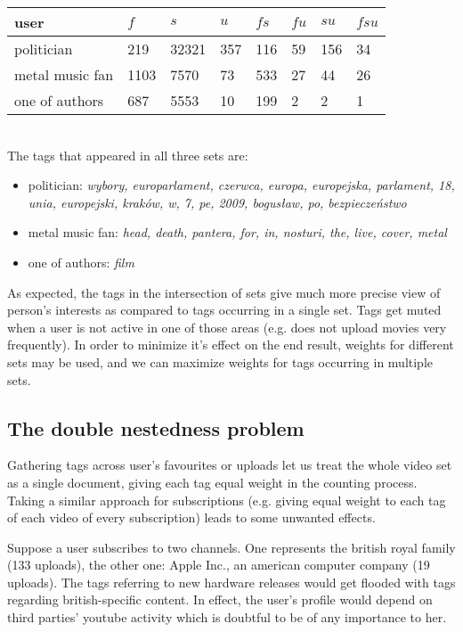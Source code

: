 \begin{tabular}{| l | l | l | l | l | l | l | l |}
user & $f$ & $s$ & $u$ & $fs$ & $fu$ & $su$ & $fsu$ \\ \hline
politician & 219 & 32321 & 357 & 116 & 59 & 156 & 34 \\
metal music fan & 1103 & 7570 & 73 & 533 & 27 & 44 & 26 \\
one of authors & 687 & 5553 & 10 & 199 & 2 & 2 & 1 \\
\end{tabular} \\

The tags that appeared in all three sets are:
\begin{itemize}
  \item{politician: \emph{wybory, europarlament, czerwca, europa, europejska,
  parlament, 18, unia, europejski, kraków, w, 7, pe, 2009, bogusław, po,
  bezpieczeństwo}}
  \item{metal music fan: \emph{head, death, pantera, for, in, nosturi, the, live, cover, metal}}
  \item{one of authors: \emph{film}}
\end{itemize}

As expected, the tags in the intersection of sets give much more precise view of person's
interests as compared to tags occurring in a single set. Tags get muted when a user is not active in one of
those areas (e.g. does not upload movies very frequently). In order to minimize it's effect on the
end result, weights for different sets may be used, and we can maximize weights for tags occurring
in multiple sets.

\subsection{The double nestedness problem}
Gathering tags across user's favourites or uploads let us treat the whole video
set as a single document, giving each tag equal weight in the counting process.
Taking a similar approach for subscriptions (e.g. giving equal weight to each
tag of each video of every subscription) leads to some unwanted effects.

Suppose a user subscribes to two channels. One represents the british royal
family (133 uploads), the other one: Apple Inc., an american computer company
(19 uploads). The tags referring to new hardware releases would get flooded with
tags regarding british-specific content. In effect, the user's profile would
depend on third parties' youtube activity which is doubtful to be of any
importance to her.

